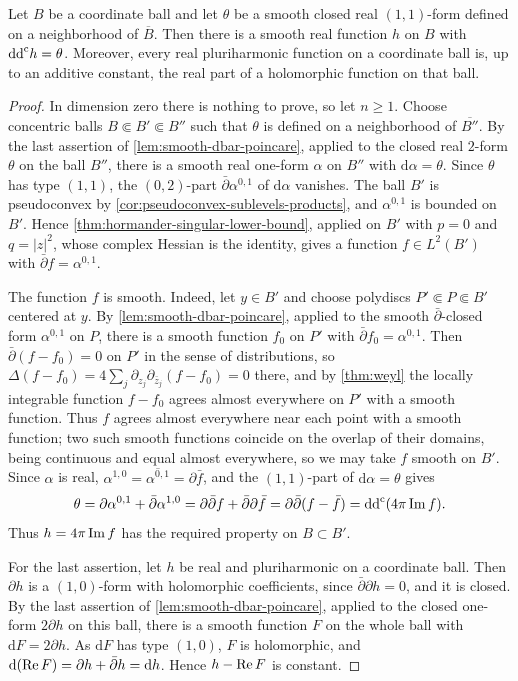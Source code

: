 \begin{lemma}\label{lem:smooth-potential-on-ball}
Let $B$ be a coordinate ball and let $\theta$ be a smooth closed real $(1,1)$-form defined on a neighborhood of $\overline B$. Then there is a smooth real function $h$ on $B$ with $\mathrm{dd}^{\mathrm{c}} h=\theta$. Moreover, every real pluriharmonic function on a coordinate ball is, up to an additive constant, the real part of a holomorphic function on that ball.
\end{lemma}
\begin{proof}
In dimension zero there is nothing to prove, so let $n\geq1$. Choose concentric balls $B\Subset B'\Subset B''$ such that $\theta$ is defined on a neighborhood of $\overline{B''}$. By the last assertion of \cref{lem:smooth-dbar-poincare}, applied to the closed real $2$-form $\theta$ on the ball $B''$, there is a smooth real one-form $\alpha$ on $B''$ with $\mathrm d\alpha=\theta$. Since $\theta$ has type $(1,1)$, the $(0,2)$-part $\bar\partial\alpha^{0,1}$ of $\mathrm d\alpha$ vanishes. The ball $B'$ is pseudoconvex by \cref{cor:pseudoconvex-sublevels-products}, and $\alpha^{0,1}$ is bounded on $B'$. Hence \cref{thm:hormander-singular-lower-bound}, applied on $B'$ with $p=0$ and $q=|z|^2$, whose complex Hessian is the identity, gives a function $f\in L^2(B')$ with $\bar\partial f=\alpha^{0,1}$.

The function $f$ is smooth. Indeed, let $y\in B'$ and choose polydiscs $P'\Subset P\Subset B'$ centered at $y$. By \cref{lem:smooth-dbar-poincare}, applied to the smooth $\bar\partial$-closed form $\alpha^{0,1}$ on $P$, there is a smooth function $f_0$ on $P'$ with $\bar\partial f_0=\alpha^{0,1}$. Then $\bar\partial(f-f_0)=0$ on $P'$ in the sense of distributions, so $\Delta(f-f_0)=4\sum_j\partial_{z_j}\partial_{\bar z_j}(f-f_0)=0$ there, and by \cref{thm:weyl} the locally integrable function $f-f_0$ agrees almost everywhere on $P'$ with a smooth function. Thus $f$ agrees almost everywhere near each point with a smooth function; two such smooth functions coincide on the overlap of their domains, being continuous and equal almost everywhere, so we may take $f$ smooth on $B'$. Since $\alpha$ is real, $\alpha^{1,0}=\overline{\alpha^{0,1}}=\partial\bar f$, and the $(1,1)$-part of $\mathrm d\alpha=\theta$ gives
\[
 \theta=\partial\alpha^{0,1}+\bar\partial\alpha^{1,0}=\partial\bar\partial f+\bar\partial\partial\bar f=\partial\bar\partial(f-\bar f)=\mathrm{dd}^{\mathrm{c}}(4\pi\operatorname{Im} f).
\]
Thus $h=4\pi\operatorname{Im} f$ has the required property on $B\subset B'$.

For the last assertion, let $h$ be real and pluriharmonic on a coordinate ball. Then $\partial h$ is a $(1,0)$-form with holomorphic coefficients, since $\bar\partial\partial h=0$, and it is closed. By the last assertion of \cref{lem:smooth-dbar-poincare}, applied to the closed one-form $2\partial h$ on this ball, there is a smooth function $F$ on the whole ball with $\mathrm dF=2\partial h$. As $\mathrm dF$ has type $(1,0)$, $F$ is holomorphic, and $\mathrm d(\operatorname{Re} F)=\partial h+\bar\partial h=\mathrm dh$. Hence $h-\operatorname{Re} F$ is constant.
\end{proof}

